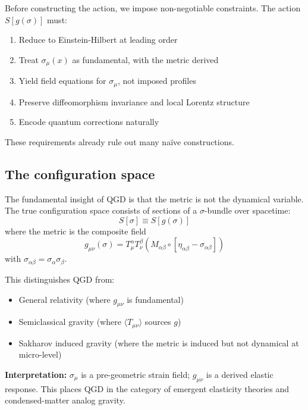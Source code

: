 \documentclass[11pt,a4paper]{article}
\theoremstyle{definition}
\theoremstyle{remark}
\begin{document}
	Before constructing the action, we impose non-negotiable constraints. The action $S[g(\sigma)]$ must:
	\begin{enumerate}
		\item Reduce to Einstein-Hilbert at leading order
		\item Treat $\sigma_\mu(x)$ as fundamental, with the metric derived
		\item Yield field equations for $\sigma_\mu$, not imposed profiles
		\item Preserve diffeomorphism invariance and local Lorentz structure
		\item Encode quantum corrections naturally
	\end{enumerate}
	
	These requirements already rule out many naïve constructions.
	
	\subsection{The configuration space}
	
	The fundamental insight of QGD is that the metric is not the dynamical variable. The true configuration space consists of sections of a $\sigma$-bundle over spacetime:
	\begin{equation}
		S[\sigma] \equiv S[g(\sigma)]
		\label{eq:config_space}
	\end{equation}
	where the metric is the composite field
	\begin{equation}
		g_{\mu\nu}(\sigma) = T^\alpha_\mu T^\beta_\nu \left(M_{\alpha\beta} \circ [\eta_{\alpha\beta} - \sigma_{\alpha\beta}]\right)
		\label{eq:composite_metric}
	\end{equation}
	with $\sigma_{\alpha\beta} = \sigma_\alpha \sigma_\beta$.
	
	This distinguishes QGD from:
	\begin{itemize}
		\item General relativity (where $g_{\mu\nu}$ is fundamental)
		\item Semiclassical gravity (where $\langle T_{\mu\nu} \rangle$ sources $g$)
		\item Sakharov induced gravity (where the metric is induced but not dynamical at micro-level)
	\end{itemize}
	
	\textbf{Interpretation:} $\sigma_\mu$ is a pre-geometric strain field; $g_{\mu\nu}$ is a derived elastic response. This places QGD in the category of emergent elasticity theories and condensed-matter analog gravity.
	
\end{document}
